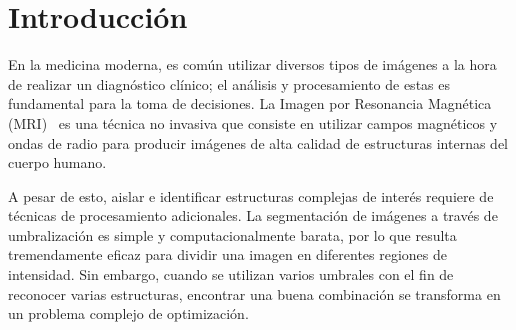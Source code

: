 \documentclass[letter, 10pt]{article}
\begin{document}
\begin{abstract}
Este trabajo aborda la segmentación de imágenes de resonancia magnética cerebral mediante umbralización multinivel: se buscan los $k$ umbrales de intensidad que dividen el histograma de la imagen en clases lo más separadas posible, lo que se mide con la varianza entre clases de Otsu. Como el número de combinaciones de umbrales crece rápidamente con $k$, se implementó en C++ un algoritmo Greedy que construye una solución inicial y un Tabu Search que la mejora. El algoritmo se evaluó en 30 instancias, con $k \in \{2, 4, 6\}$, frente al óptimo global obtenido por programación dinámica, y se estudió el efecto de la tenencia y del número de iteraciones. Greedy + TS alcanza el óptimo en 29 de las 30 instancias con la configuración base, y en las 30 con una tenencia mayor, en menos de un milisegundo por instancia.
\end{abstract}

\section{Introducción}
En la medicina moderna, es com\'un utilizar diversos tipos de im\'agenes a la hora de realizar un diagn\'ostico cl\'inico;
el an\'alisis y procesamiento de estas es fundamental para la toma de decisiones. La Imagen por Resonancia Magn\'etica (MRI)~\cite{Islam2023MedicalImaging}
es una t\'ecnica no invasiva que consiste en utilizar campos magn\'eticos y ondas de radio para producir im\'agenes de alta calidad de estructuras internas del cuerpo humano.

A pesar de esto, aislar e identificar estructuras complejas de inter\'es requiere de t\'ecnicas de procesamiento adicionales.
La segmentaci\'on de im\'agenes a trav\'es de umbralizaci\'on es simple y computacionalmente barata,
por lo que resulta tremendamente eficaz para dividir una imagen en diferentes regiones de intensidad.
Sin embargo, cuando se utilizan varios umbrales con el fin de reconocer varias estructuras,
encontrar una buena combinaci\'on se transforma en un problema complejo de optimizaci\'on.
\end{document}
